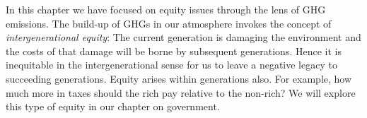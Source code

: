 In this chapter we have focused on equity issues through the lens of GHG
emissions. The build-up of GHGs in our atmosphere invokes the concept of 
\textit{intergenerational equity}: The current generation is damaging the
environment and the costs of that damage will be borne by subsequent
generations. Hence it is inequitable in the intergenerational sense for us
to leave a negative legacy to succeeding generations. Equity arises within
generations also. For example, how much more in taxes should the rich pay
relative to the non-rich? We will explore this type of equity in our chapter
on government.
